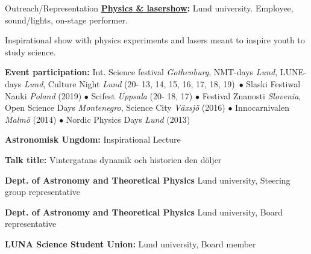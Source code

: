 \begin{rubric}{Outreach/Representation}
\entry*[2013 - current]%
\textbf{\href{https://www.facebook.com/Physicsandlasershow}{Physics \& lasershow}:} Lund university. Employee, sound/lights, on-stage performer. \par Inspirational show with physics experiments and lasers meant to inspire youth to study science. \par
\textbf{Event participation:} Int. Science festival \textit{Gothenburg}, NMT-days \textit{Lund}, LUNE-days \textit{Lund}, Culture Night \textit{Lund} (20- 13, 14, 15, 16, 17, 18, 19)\ $\bullet$ Slaski Festiwal Nauki \textit{Poland} (2019)  $\bullet$ Scifest \textit{Uppsala} (20- 18, 17) $\bullet$ Festival Znanosti \textit{Slovenia}, Open Science Days \textit{Montenegro}, Science City \textit{Växsjö} (2016) $\bullet$ Innocarnivalen \textit{Malmö} (2014) $\bullet$ Nordic Physics Days \textit{Lund} (2013)

\entry*[2020]%
\textbf{Astronomisk Ungdom:} Inspirational Lecture \par 
\textbf{Talk title:} Vintergatans dynamik och historien den döljer

\entry*[2020-current]%
\textbf{Dept. of Astronomy and Theoretical Physics} Lund university, Steering group representative \par

\entry*[2017-2018]%
\textbf{Dept. of Astronomy and Theoretical Physics} Lund university, Board representative \par

\entry*[2013-2015]%
\textbf{LUNA Science Student Union:} Lund university, Board member \par

\end{rubric}
